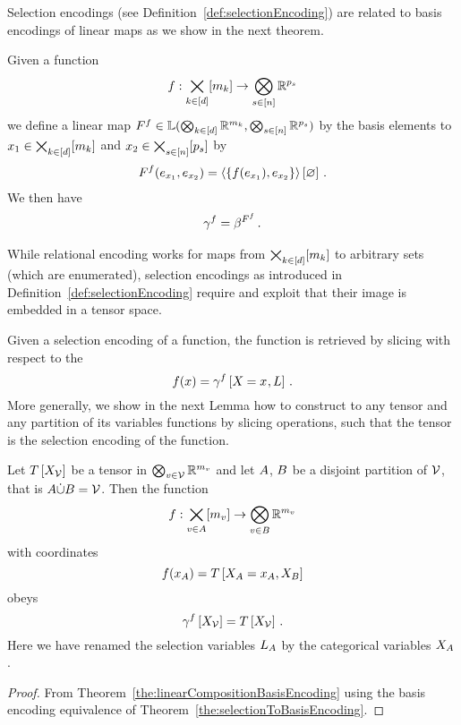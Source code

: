 Selection encodings (see Definition~\ref{def:selectionEncoding}) are related to basis encodings of linear maps as we show in the next theorem.

\begin{theorem}\label{the:selectionToBasisEncoding}
	Given a function 
		\[ f : \bigtimes_{k\in[d]}[m_{k}] \rightarrow \bigotimes_{s\in[n]}\mathbb{R}^{p_{s}} \]
	we define a linear map $F^{f}\in\mathbb{L}(\bigotimes_{k\in[d]} \mathbb{R}^{m_{k}},\bigotimes_{s\in[n]}\mathbb{R}^{p_{s}})$ by the basis elements to $x_{1} \in\bigtimes_{k\in[d]}[m_{k}]$ and $x_{2}\in\bigtimes_{s\in[n]}[p_{s}]$ by
	\begin{align*}
	 	F^{f}(e_{x_{1}},e_{x_{2}}) 
		= \left\langle \left\{f(e_{x_{1}}),e_{x_{2}}\right\}\right\rangle \left[ \varnothing \right] \, .  
	\end{align*}
	We then have
	\begin{align*}
		\gamma^{f} = \beta^{F^{f}} \, . 
	\end{align*}
\end{theorem}





While relational encoding works for maps from $\bigtimes_{k\in[d]}[m_{k}]$ to arbitrary sets (which are enumerated), selection encodings as introduced in Definition~\ref{def:selectionEncoding} require and exploit that their image is embedded in a tensor space.

Given a selection encoding of a function, the function is retrieved by slicing with respect to the 
	\[ f(x) = \gamma^{f}\left[X_{}=x_{},L\right] \, . \]
More generally, we show in the next Lemma how to construct to any tensor and any partition of its variables functions by slicing operations, such that the tensor is the selection encoding of the function.

\begin{lemma}\label{lem:inverseSelectionEncoding} %
	Let $T\left[X_{\mathcal{V}}\right]$ be a tensor in $\bigotimes_{v\in\mathcal{V}}\mathbb{R}^{m_{v}}$ and let $A$, $B$ be a disjoint partition of $\mathcal{V}$, that is $A\dot{\cup}B=\mathcal{V}$.
	Then the function
		\[ f : \bigtimes_{v\in A}[m_{v}] \rightarrow \bigotimes_{v\in B} \mathbb{R}^{m_{v}}  \]
	with coordinates
		\[ f(x_{A}) = T\left[X_{A}=x_{A},X_{B}\right]  \]
	obeys
		\[ \gamma^{f}\left[X_{\mathcal{V}}\right] = T\left[X_{\mathcal{V}}\right] \, . \]
	Here we have renamed the selection variables $L_{A}$ by the categorical variables $X_{A}$. 
\end{lemma}
\begin{proof}
	From Theorem~\ref{the:linearCompositionBasisEncoding} using the basis encoding equivalence of Theorem~\ref{the:selectionToBasisEncoding}.
\end{proof}


